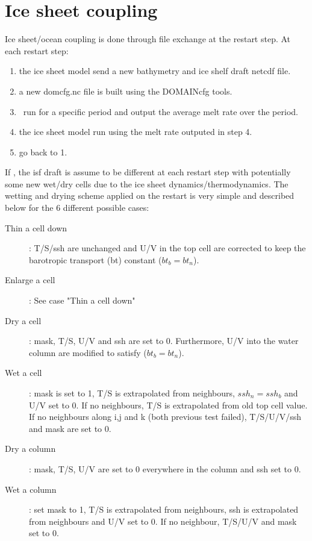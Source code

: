 \documentclass[../main/NEMO_manual]{subfiles}
\begin{document}
\section{Ice sheet coupling}
\label{sec:SBC_iscpl}

\begin{listing}
  \caption{}
  \label{lst:namsbc_iscpl}
\end{listing}

Ice sheet/ocean coupling is done through file exchange at the restart step.
At each restart step:

\begin{enumerate}
\item the ice sheet model send a new bathymetry and ice shelf draft netcdf file.
\item a new domcfg.nc file is built using the DOMAINcfg tools.
\item \NEMO\ run for a specific period and output the average melt rate over the period.
\item the ice sheet model run using the melt rate outputed in step 4.
\item go back to 1.
\end{enumerate}

If , the isf draft is assume to be different at each restart step with
potentially some new wet/dry cells due to the ice sheet dynamics/thermodynamics.
The wetting and drying scheme applied on the restart is very simple and described below for the 6 different possible cases:

\begin{description}
\item [Thin a cell down]: T/S/ssh are unchanged and U/V in the top cell are corrected to keep the barotropic transport (bt) constant
  ($bt_b=bt_n$).
\item [Enlarge  a cell]: See case "Thin a cell down"
\item [Dry a cell]: mask, T/S, U/V and ssh are set to 0.
  Furthermore, U/V into the water column are modified to satisfy ($bt_b=bt_n$).
\item [Wet a cell]: mask is set to 1, T/S is extrapolated from neighbours, $ssh_n = ssh_b$ and U/V set to 0.
  If no neighbours, T/S is extrapolated from old top cell value.
  If no neighbours along i,j and k (both previous test failed), T/S/U/V/ssh and mask are set to 0.
\item [Dry a column]: mask, T/S, U/V are set to 0 everywhere in the column and ssh set to 0.
\item [Wet a column]: set mask to 1, T/S is extrapolated from neighbours, ssh is extrapolated from neighbours and U/V set to 0.
  If no neighbour, T/S/U/V and mask set to 0.
\end{description}
\end{document}
